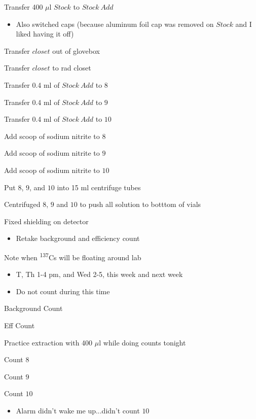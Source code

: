 \documentclass[idxtotoc,hyperref,openany,oneside]{labbook} %
\newcommand{\cmark}{\ding{51}}%
\newcommand{\done}{\rlap{$\square$}{\raisebox{2pt}{\large\hspace{1pt}\cmark}}%
  \hspace{-2.5pt}}
\newcommand{\tss}{\textsuperscript}
\begin{document}
\begin{todolist}
\item[\done]{Transfer 400 $\mu$l $\boxed{Stock}$ to $\boxed{Stock\ Add}$}
  \begin{itemize}
  \item{Also switched caps (because aluminum foil cap was removed on
    $\boxed{Stock}$ and I liked having it off)}
  \end{itemize}
\item[\done]{Transfer $\boxed{closet}$ out of glovebox}
\item[\done]{Transfer $\boxed{closet}$ to rad closet}
\item[\done]{Transfer 0.4 ml of $\boxed{Stock\ Add}$ to $\boxed{8}$}
\item[\done]{Transfer 0.4 ml of $\boxed{Stock\ Add}$ to $\boxed{9}$}
\item[\done]{Transfer 0.4 ml of $\boxed{Stock\ Add}$ to $\boxed{10}$}
\item[\done]{Add scoop of sodium nitrite to $\boxed{8}$}
\item[\done]{Add scoop of sodium nitrite to $\boxed{9}$}
\item[\done]{Add scoop of sodium nitrite to $\boxed{10}$}
\item[\done]{Put $\boxed{8}$, $\boxed{9}$, and $\boxed{10}$ into
  15 ml centrifuge tubes}
\item[\done]{Centrifuged $\boxed{8}$, $\boxed{9}$
  and $\boxed{10}$ to push all solution to
  botttom of vials}
\item[\done]{Fixed shielding on detector}
  \begin{itemize}
  \item{Retake background and efficiency count}
  \end{itemize}
\item{Note when \tss{137}Cs will be floating around lab}
  \begin{itemize}
  \item{T, Th 1-4 pm, and Wed 2-5, this week and next week}
  \item{Do not count during this time}
  \end{itemize}
\item[\done]{Background Count}
\item[\done]{Eff Count}
\item{Practice extraction with 400 $\mu$l while doing counts tonight}
\item[\done]{Count $\boxed{8}$}
\item[\done]{Count $\boxed{9}$}
\item{Count $\boxed{10}$}
  \begin{itemize}
  \item{Alarm didn't wake me up...didn't count $\boxed{10}$}
  \end{itemize}
\end{todolist}
\end{document}
